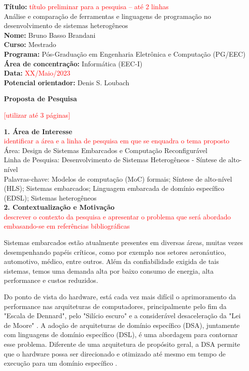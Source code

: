 \noindent
\textbf{Título:} \textcolor{red}{título preliminar para a pesquisa – até 2 linhas} \\
Análise e comparação de ferramentas e linguagens de programação no desenvolvimento de sistemas heterogêneos\\
\textbf{Nome:} Bruno Basso Brandani \\
\textbf{Curso:} Mestrado \\
\textbf{Programa:} Pós-Graduação em Engenharia Eletrônica e Computação (PG/EEC) \\
\textbf{Área de concentração:} Informática (EEC-I) \\
\textbf{Data:} \textcolor{red}{XX/Maio/2023} \\
\textbf{Potencial orientador:} Denis S. Loubach \\

\centerline{\textbf{Proposta de Pesquisa}}
\centerline{\textcolor{red}{[utilizar até 3 páginas] }}


\noindent
\textbf{1. Área de Interesse}\\
\noindent
\textcolor{red}{identificar a área e a linha de pesquisa em que se enquadra o tema proposto}
\\
Área: Design de Sistemas Embarcados e Computação Reconfigurável\\
Linha de Pesquisa: Desenvolvimento de Sistemas Heterogêneos - Síntese de alto-nível\\
Palavras-chave: Modelos de computação (MoC) formais; Síntese de alto-nível (HLS); Sistemas embarcados; Linguagem embarcada de domínio específico (EDSL); Sistemas heterogêneos\\
\noindent
\textbf{2. Contextualização e Motivação}\\
\noindent
\textcolor{red}{descrever o contexto da pesquisa e apresentar o problema que será abordado embasando-se em referências bibliográficas}

Sistemas embarcados estão atualmente presentes em diversas áreas, muitas vezes desempenhando papéis críticos, como por exemplo nos setores aeronáutico, automotivo, médico, entre outros. Além da confiabilidade exigida de tais sistemas, temos uma demanda alta por baixo consumo de energia, alta performance e custos reduzidos.

Do ponto de vista do hardware, está cada vez mais difícil o aprimoramento da performance nas arquiteturas de computadores, principalmente pelo fim da "Escala de Dennard", pelo "Silício escuro" e a considerável desaceleração da "Lei de Moore" \cite{Loubach2022a}. A adoção de arquiteturas de domínio específico (DSA), juntamente com linguagens de domínio específico (DSL), é uma abordagem para contornar esse problema. Diferente de uma arquitetura de propósito geral, a DSA permite que o hardware possa ser direcionado e otimizado até mesmo em tempo de execução para um domínio específico \cite{Loubach2019a}.

